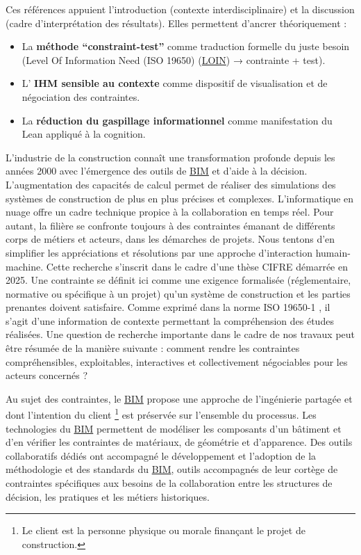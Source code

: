 \documentclass[a4paper,12pt]{article}
\begin{document}
Ces références appuient l’introduction (contexte interdisciplinaire) et la discussion (cadre d’interprétation des résultats).  
Elles permettent d’ancrer théoriquement :
\begin{itemize}
\item La \textbf{méthode “constraint-test”} comme traduction formelle du juste besoin (Level Of Information Need (ISO 19650)
 (\protect\hyperlink{gls-2}{\label{gls-2-use-1}LOIN}) → contrainte + test).
\item L’ \textbf{IHM sensible au contexte} comme dispositif de visualisation et de négociation des contraintes.
\item La \textbf{réduction du gaspillage informationnel} comme manifestation du Lean appliqué à la cognition.
\end{itemize}

L’industrie de la construction connaît une transformation profonde depuis les années 2000 avec l’émergence des outils de \protect\hyperlink{gls-1}{\label{gls-1-use-2}BIM} et d’aide à la décision. L’augmentation des capacités de calcul permet de réaliser des simulations des systèmes de construction de plus en plus précises et complexes. L’informatique en nuage  offre un cadre technique propice à la collaboration en temps réel. Pour autant, la filière se confronte toujours à des contraintes émanant de différents corps de métiers et acteurs, dans les démarches de projets. Nous tentons d’en simplifier les appréciations et résolutions par une approche d’interaction humain-machine. Cette recherche s’inscrit dans le cadre d’une thèse CIFRE démarrée en 2025. Une contrainte se définit ici comme une exigence formalisée (réglementaire, normative ou spécifique à un projet) qu’un système de construction et les parties prenantes doivent satisfaire. Comme exprimé dans la norme ISO 19650-1 \autocite{OrganisationNumerisationInformations2018a}, il s’agit d’une information de contexte permettant la compréhension des études réalisées.  Une question de recherche importante dans le cadre de nos travaux peut être résumée de la manière suivante : comment rendre les contraintes compréhensibles, exploitables, interactives et collectivement négociables pour les acteurs concernés ?

Au sujet des contraintes, le \protect\hyperlink{gls-1}{\label{gls-1-use-3}BIM} propose une approche de l'ingénierie partagée et dont l’intention du client \footnote{Le client est la personne physique ou morale finançant le projet de construction.} est préservée sur l’ensemble du processus. Les technologies du \protect\hyperlink{gls-1}{\label{gls-1-use-4}BIM} permettent de modéliser les composants d'un bâtiment et d'en vérifier les contraintes de matériaux, de géométrie et d’apparence. Des outils collaboratifs dédiés ont accompagné le développement et l’adoption de la méthodologie et des standards du \protect\hyperlink{gls-1}{\label{gls-1-use-5}BIM}, outils accompagnés de leur cortège de contraintes spécifiques aux besoins de la collaboration entre les structures de décision, les pratiques et les métiers historiques. 
\end{document}
